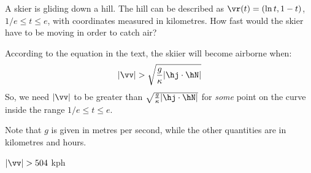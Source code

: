 \begin{question}
A skier is gliding down a hill. The hill can be described as $\vr(t)=(\ln t, 1-t)$, $1/e \le t \le e$, with coordinates  measured in kilometres. How fast would the skier have to be moving in order to catch air?

\end{question}
\begin{hint}
According to the equation in the text, the skiier will become airborne when:
\[|\vv|>\sqrt{\frac{g}{\kappa}|\hj\cdot\hN|}\]
So, we need $|\vv|$ to be greater than $\sqrt{\frac{g}{\kappa}|\hj\cdot\hN|}$ for \emph{some} point on the curve inside the range $1/e \le t \le e$.

Note that $g$ is given in metres per second, while the other quantities are in kilometres and hours. 
\end{hint}
\begin{answer}
$|\vv| > 504$ kph
\end{answer}
